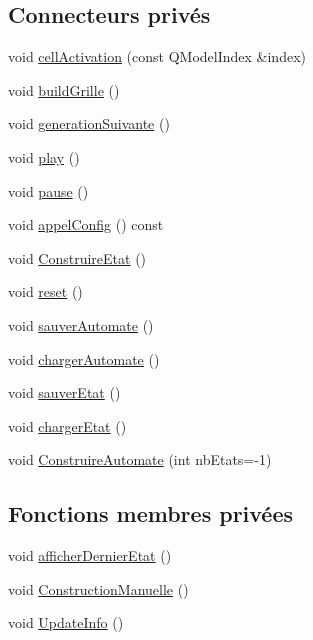 \subsection*{Connecteurs privés}
\begin{DoxyCompactItemize}
\item 
void \mbox{\hyperlink{classfenetre1_d_a4ebfed6ec778e38de2039b077352d138}{cell\+Activation}} (const Q\+Model\+Index \&index)
\item 
void \mbox{\hyperlink{classfenetre1_d_a65b4806314f4a9ae06480579b94fde19}{build\+Grille}} ()
\item 
void \mbox{\hyperlink{classfenetre1_d_a26b1985ee0fdc3740a81844e38acd358}{generation\+Suivante}} ()
\item 
void \mbox{\hyperlink{classfenetre1_d_a30a0daefde3939596d4a4a4008a3e123}{play}} ()
\item 
void \mbox{\hyperlink{classfenetre1_d_af5560aef0fb4dd20062b3e27d18735b8}{pause}} ()
\item 
void \mbox{\hyperlink{classfenetre1_d_ac3be489fd45189bb7fb2a0170fc261ec}{appel\+Config}} () const
\item 
void \mbox{\hyperlink{classfenetre1_d_a32838578ed2cf59aa0fdb4115281ef3e}{Construire\+Etat}} ()
\item 
void \mbox{\hyperlink{classfenetre1_d_a8e06b057016afe1f0751493beb053107}{reset}} ()
\item 
void \mbox{\hyperlink{classfenetre1_d_a0f5127eb0216f22761ec7f57b8846cd8}{sauver\+Automate}} ()
\item 
void \mbox{\hyperlink{classfenetre1_d_a812d2a814c96979138174c04137aa4fd}{charger\+Automate}} ()
\item 
void \mbox{\hyperlink{classfenetre1_d_a120deb2f665cb65120c083d31c39a393}{sauver\+Etat}} ()
\item 
void \mbox{\hyperlink{classfenetre1_d_a4e7c8a38df8987fd216c355a163d6c46}{charger\+Etat}} ()
\item 
void \mbox{\hyperlink{classfenetre1_d_a3f9e0d5aaf29e45c7b04efb10ae450a1}{Construire\+Automate}} (int nb\+Etats=-\/1)
\end{DoxyCompactItemize}
\subsection*{Fonctions membres privées}
\begin{DoxyCompactItemize}
\item 
void \mbox{\hyperlink{classfenetre1_d_a8bf270f254fa50b992840f4b7d839893}{afficher\+Dernier\+Etat}} ()
\item 
void \mbox{\hyperlink{classfenetre1_d_a0af88e56b03b02ac2b1e7c44fe2699ce}{Construction\+Manuelle}} ()
\item 
void \mbox{\hyperlink{classfenetre1_d_aca92762c8a29d06ad95761dafce3a53f}{Update\+Info}} ()
\end{DoxyCompactItemize}

